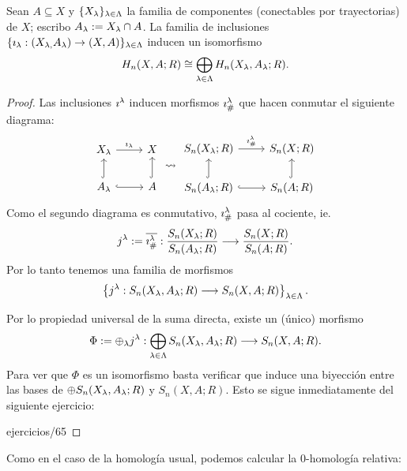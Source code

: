 \documentclass[../../topologia_algebraica]{subfiles}
\begin{document}
\begin{prop}
  Sean $A\subseteq X$ y $\{X_{\lambda}\}_{\lambda\in\Lambda}$ la familia de componentes (conectables
  por trayectorias) de $X$; escribo $A_{\lambda}:=X_{\lambda}\cap A$. La familia de inclusiones
  $\{\imath_{\lambda}:(X_{\lambda,}A_{\lambda})\rightarrow(X,A)\}_{\lambda\in\Lambda}$ inducen un isomorfismo
  \[
    H_n(X,A;R)\cong \bigoplus_{\lambda\in\Lambda} H_n(X_{\lambda},A_{\lambda};R).
  \]
\end{prop}
\begin{proof}
  Las inclusiones $\imath^{\lambda}$ inducen morfismos $\imath^{\lambda}_{\#}$ que hacen conmutar el
  siguiente diagrama:
\[
  \begin{tikzcd}
    X_{\la} \arrow[r,"\imath_{\la}"] & X  \\
    A_{\la} \arrow[r,hookrightarrow] \arrow[u,hookrightarrow] & A \arrow[u,hookrightarrow] 
  \end{tikzcd} \rightsquigarrow
  \begin{tikzcd}
    S_n(X_{\la};R) \arrow[r,"\imath^{\la}_{\#}"] & S_n(X;R) \\
    S_n(A_{\la};R) \arrow[r,hookrightarrow] \arrow[u,hookrightarrow] & S_n(A;R) \arrow[u,hookrightarrow]
  \end{tikzcd}
\]
Como el segundo  diagrama es conmutativo, $\imath^{\lambda}_{\#}$ pasa al cociente, ie.
\[
  j^{\lambda}:=\overline{\imath^{\lambda}_{\#}}:\frac{S_n(X_{\lambda};R)}{S_n(A_{\lambda};R)} \longrightarrow\frac{S_n(X;R)}{S_n(A;R)}.
\]
Por lo tanto tenemos una familia de morfismos
\[
  \left\{ j^{\lambda}:S_n(X_{\lambda},A_{\lambda};R) \longrightarrow S_n(X,A;R) \right\}_{\lambda\in\Lambda}.
\]

Por lo propiedad universal de la suma directa, existe un (\'unico) morfismo
\[
  \Phi:=\oplus_{\lambda} j^{\lambda}:\bigoplus_{\lambda\in\Lambda} S_n(X_{\lambda},A_{\lambda};R)\longrightarrow S_n(X,A;R). 
\]
Para ver que $\Phi$ es un isomorfismo basta verificar que induce una biyecci\'on entre las bases de
$\oplus S_n(X_{\lambda},A_{\lambda};R)$ y $S_n(X,A;R)$. Esto se sigue inmediatamente del siguiente ejercicio:

{ejercicios/65} %
\end{proof}

Como en el caso de la homolog\'ia usual, podemos calcular la 0-homolog\'ia relativa:
\end{document}
